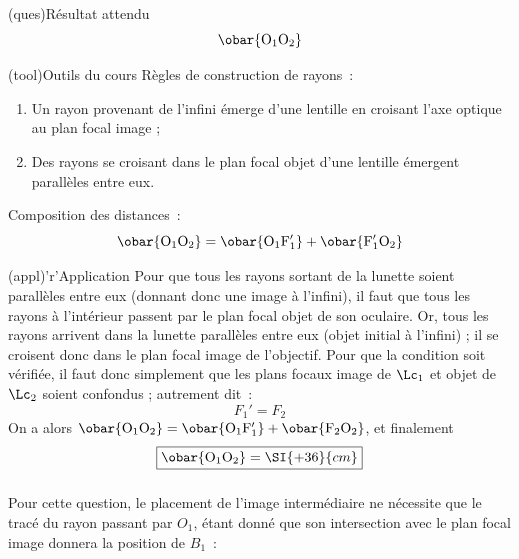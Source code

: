 \documentclass[../../main/main.tex]{subfiles}
\begin{document}
{	\begin{tcbraster}[raster columns=7, raster equal height=rows]
		\begin{tcolorbox}[blankest, raster multicolumn=3, space to=\myspac]
			\begin{tcbraster}[raster columns=1]
				\begin{tcb}[](ques){Résultat attendu}
					$$\obar{\rm O_1O_2}$$
				\end{tcb}
				\begin{tcb}[add to natural height=\myspac](tool){Outils du cours}
					Règles de construction de rayons~:
					\begin{enumerate}
						\item Un rayon provenant de l'infini émerge d'une lentille en
						      croisant l'axe optique au plan focal image ;
						\item Des rayons se croisant dans le plan focal objet d'une lentille
						      émergent parallèles entre eux.
					\end{enumerate}
					Composition des distances~:
					\[
						\obar{\rm O_1O_2} = \obar{\rm O_1F_1'} + \obar{\rm F_1'O_2}
					\]
				\end{tcb}
			\end{tcbraster}
		\end{tcolorbox}
		\begin{tcb}[raster multicolumn=4](appl)'r'{Application}
			Pour que tous les rayons sortant de la lunette soient parallèles entre eux
			(donnant donc une image à l'infini), il faut que tous les rayons à
			l'intérieur passent par le plan focal objet de son oculaire.
			\bigbreak
			Or, tous les rayons arrivent dans la lunette parallèles entre eux (objet
			initial à l'infini) ; il se croisent donc dans le plan focal image de
			l'objectif.
			\bigbreak
			Pour que la condition soit vérifiée, il faut donc simplement que les plans
			focaux image de $\Lc_1$ et objet de $\Lc_2$ soient confondus ; autrement
			dit~:
			\[
				\boxed{F_1' = F_2}
			\]
			On a alors $\obar{\rm O_1O_2} = \obar{\rm O_1F_1'} + \obar{\rm F_2O_2}$,
			et finalement
			\[
				\boxed{\obar{\rm O_1O_2} = \SI{+36}{cm}}
			\]
		\end{tcb}
	\end{tcbraster}

	\subsubsection{}
	Pour cette question, le placement de l'image intermédiaire ne nécessite que le
	tracé du rayon passant par $O_1$, étant donné que son intersection avec le plan
	focal image donnera la position de $B_1$~:

}
\end{document}
